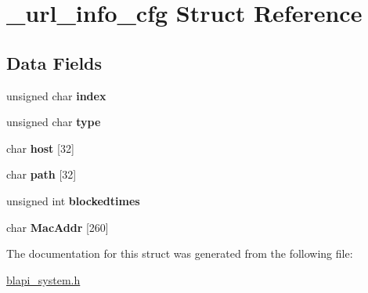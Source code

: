 \hypertarget{struct__url__info__cfg}{}\section{\+\_\+url\+\_\+info\+\_\+cfg Struct Reference}
\label{struct__url__info__cfg}
\subsection*{Data Fields}
\begin{DoxyCompactItemize}
\item 
\mbox{\label{struct__url__info__cfg_a2c75ab6277d6146b99b4900ad4e43771}} 
unsigned char {\bfseries index}
\item 
\mbox{\label{struct__url__info__cfg_af77d63d4e71867f071a7f5bb075aa759}} 
unsigned char {\bfseries type}
\item 
\mbox{\label{struct__url__info__cfg_a77a15781ca50a98e3afd9a75828841e7}} 
char {\bfseries host} \mbox{[}32\mbox{]}
\item 
\mbox{\label{struct__url__info__cfg_ac4a8aa71fa8ff2db34443b04d51e556a}} 
char {\bfseries path} \mbox{[}32\mbox{]}
\item 
\mbox{\label{struct__url__info__cfg_a2c074e1d02bb84bf02ac33473d231ee6}} 
unsigned int {\bfseries blockedtimes}
\item 
\mbox{\label{struct__url__info__cfg_a75267bacb3b4790c3ea27e2a53030029}} 
char {\bfseries Mac\+Addr} \mbox{[}260\mbox{]}
\end{DoxyCompactItemize}


The documentation for this struct was generated from the following file\+:\begin{DoxyCompactItemize}
\item 
\hyperlink{blapi__system_8h}{blapi\+\_\+system.\+h}\end{DoxyCompactItemize}
